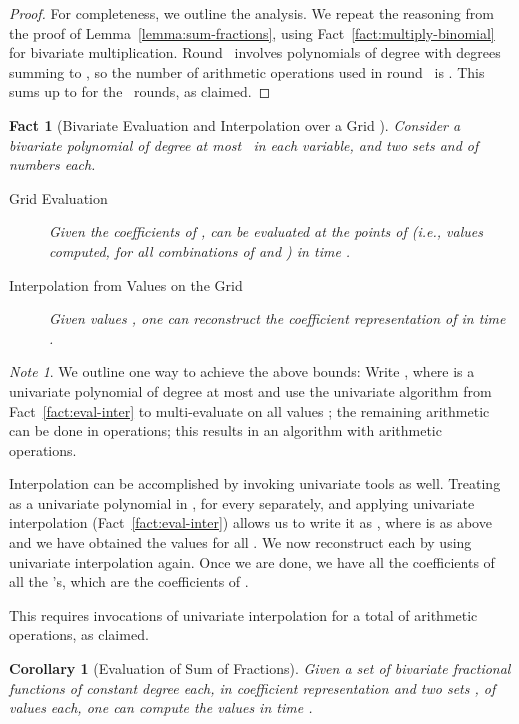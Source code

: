 \documentclass[11pt]{article}
\newtheorem{corollary}[theorem]{Corollary}
\newtheorem{fact}[theorem]{Fact}
\theoremstyle{remark}
\newtheorem*{note}{Note}
\begin{document}
\begin{proof}
  For completeness, we outline the analysis. 
  We repeat the reasoning from the proof of Lemma~\ref{lemma:sum-fractions}, using Fact~\ref{fact:multiply-binomial} for bivariate multiplication.
  Round~ involves polynomials of degree  with degrees summing to , so the number of arithmetic operations used in round~ is .  This sums up to  for the ~rounds, as claimed.
\end{proof}

\begin{fact}[Bivariate Evaluation and Interpolation over a Grid \cite{p-smpm-94,bp-pmcfa-94}]
  \label{fact:bi:eval-inter-grid}
  Consider a bivariate polynomial  of degree at most~ in
  each variable, and two sets  and  of 
  numbers each.
  \begin{description}
  \item[Grid Evaluation]
    Given the  coefficients of ,  can be evaluated at the
    points of  (i.e., values  computed, for all
    combinations of  and ) in time .
\item[Interpolation from Values on the Grid]
    Given  values , one can reconstruct the
    coefficient representation of  in time .
  \end{description}
\end{fact}

\begin{note}
  We outline one way to achieve the above bounds: Write , where  is a
  univariate polynomial of degree at most  and use the
  univariate algorithm from Fact~\ref{fact:eval-inter} to
  multi-evaluate  on all values ; the remaining arithmetic
  can be done in  operations; this results in an algorithm with  arithmetic operations.


  Interpolation can be accomplished by invoking univariate tools as well.  Treating  as a univariate polynomial in , for every  separately, and applying univariate interpolation (Fact~\ref{fact:eval-inter}) allows us to write it as , where  is as above and we have obtained the values  for all . We now reconstruct each  by using univariate interpolation again.  Once we are done, we have all the coefficients of all the 's, which are the coefficients of .

  This requires  invocations of univariate interpolation for a total of  arithmetic operations, as claimed.



\end{note}

\begin{corollary}[Evaluation of Sum of Fractions]
  \label{cor:eval-sum-fractions-bi}
  Given a set of  bivariate fractional functions
   of constant degree each, in coefficient
  representation and two sets ,  of  values
  each, one can compute the  values  in time .
\end{corollary}
\end{document}
